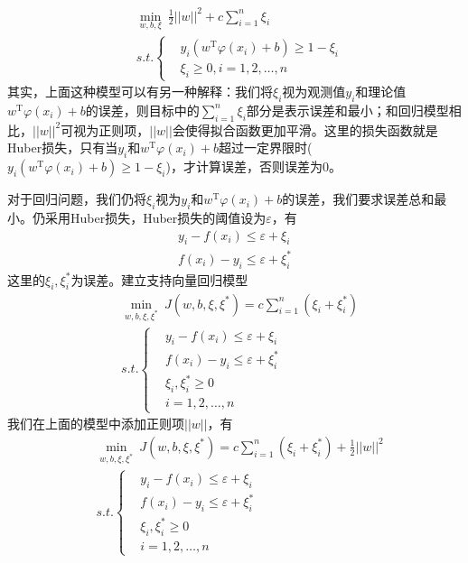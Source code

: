     \begin{align*}
    & \min_{w,b,\xi} \ \frac{1}{2}||w||^2+c\sum_{i=1}^n\xi_i \\
    & s.t.\left\{
    \begin{aligned}
    & y_i(w^\mathrm{T}\varphi(x_i)+b) \geqslant 1-\xi_i\\
    & \xi_i \geqslant 0, i=1,2,\dots,n
    \end{aligned}
    \right.
    \end{align*}
    其实，上面这种模型可以有另一种解释：我们将$\xi_i$视为观测值$y_i$和理论值$w^\mathrm{T}\varphi(x_i)+b$的误差，则目标中的$\sum_{i=1}^n\xi_i$部分是表示误差和最小；和回归模型相比，$||w||^2$可视为正则项，$||w||$会使得拟合函数更加平滑。这里的损失函数就是Huber损失，只有当$y_i$和$w^\mathrm{T}\varphi(x_i)+b$超过一定界限时($y_i(w^\mathrm{T}\varphi(x_i)+b) \geqslant 1-\xi_i$)，才计算误差，否则误差为0。
    \par
    对于回归问题，我们仍将$\xi_i$视为$y_i$和$w^\mathrm{T}\varphi(x_i)+b$的误差，我们要求误差总和最小。仍采用Huber损失，Huber损失的阈值设为$\varepsilon$，有
    \begin{align*}
    y_i - f(x_i) \leqslant \varepsilon + \xi_i  \\
    f(x_i) - y_i \leqslant \varepsilon + \xi_i^*
    \end{align*}
    这里的$\xi_i,\xi_i^*$为误差。建立支持向量回归模型
    \begin{align*}
    & \min_{w,b,\xi,\xi^*} \ J(w,b,\xi,\xi^*) = c\sum_{i=1}^n (\xi_i+\xi_i^*) \\
    & s.t.\left\{
    \begin{aligned}
    & y_i - f(x_i) \leqslant \varepsilon + \xi_i  \\
    & f(x_i) - y_i \leqslant \varepsilon + \xi_i^* \\
    & \xi_i,\xi_i^*\geqslant 0\\
    & i=1,2,\dots,n
    \end{aligned}
    \right.
    \end{align*}
    我们在上面的模型中添加正则项$||w||$，有
    \begin{align*}
    & \min_{w,b,\xi,\xi^*} \ J(w,b,\xi,\xi^*) = c\sum_{i=1}^n (\xi_i+\xi_i^*) + \frac{1}{2}||w||^2\\
    & s.t.\left\{
    \begin{aligned}
    & y_i - f(x_i) \leqslant \varepsilon + \xi_i  \\
    & f(x_i) - y_i \leqslant \varepsilon + \xi_i^* \\
    & \xi_i,\xi_i^*\geqslant 0\\
    & i=1,2,\dots,n
    \end{aligned}
    \right.
    \end{align*}
